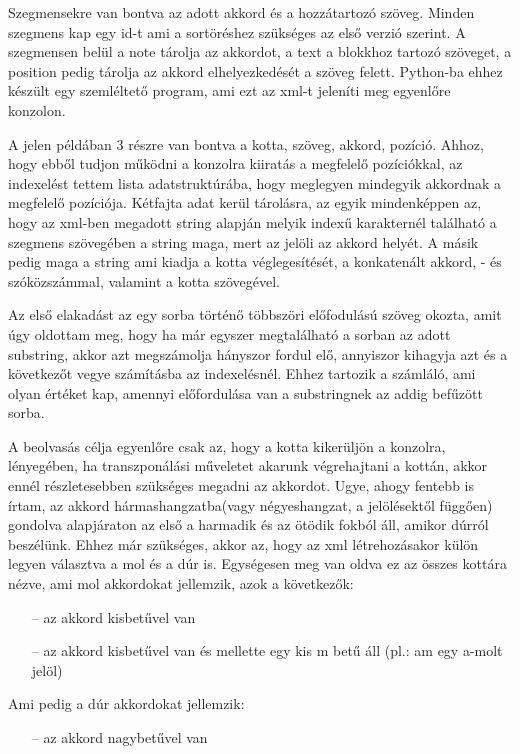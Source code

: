 Szegmensekre van bontva az adott akkord és a hozzátartozó szöveg. Minden szegmens kap egy id-t ami a sortöréshez szükséges az első verzió szerint. A szegmensen belül a note tárolja az akkordot, a text a blokkhoz tartozó szöveget, a position pedig tárolja az akkord elhelyezkedését a szöveg felett. Python-ba ehhez készült egy szemléltető program, ami ezt az xml-t jeleníti meg egyenlőre konzolon.

A jelen példában 3 részre van bontva a kotta, szöveg, akkord, pozíció. Ahhoz, hogy ebből tudjon  működni a konzolra kiiratás a megfelelő pozíciókkal, az indexelést tettem lista adatstruktúrába, hogy meglegyen mindegyik akkordnak a megfelelő pozíciója. Kétfajta adat kerül tárolásra, az egyik mindenképpen az, hogy az xml-ben megadott string alapján melyik indexű karakternél található a szegmens szövegében a string maga, mert az jelöli az akkord helyét. A másik pedig maga a string ami kiadja a kotta véglegesítését, a konkatenált akkord, - és szóközszámmal, valamint a kotta szövegével.

Az első elakadást az egy sorba történő többszöri előfodulású szöveg okozta, amit úgy oldottam meg, hogy ha már egyszer megtalálható a sorban az adott substring, akkor azt megszámolja hányszor fordul elő, annyiszor kihagyja azt és a következőt vegye számításba az indexelésnél. Ehhez tartozik a számláló, ami olyan értéket kap, amennyi előfordulása van a substringnek az addig befűzött sorba.

A beolvasás célja egyenlőre csak az, hogy a kotta kikerüljön a konzolra, lényegében, ha transzponálási műveletet akarunk végrehajtani a kottán, akkor ennél részletesebben szükséges megadni az akkordot. Ugye, ahogy fentebb is írtam, az akkord hármashangzatba(vagy négyeshangzat, a jelölésektől függően) gondolva alapjáraton az első a harmadik és az ötödik fokból áll, amikor dúrról beszélünk. Ehhez már szükséges, akkor az, hogy az xml létrehozásakor külön legyen választva a mol és a dúr is. Egységesen meg van oldva ez az összes kottára nézve, ami mol akkordokat jellemzik, azok a következők:
\begin{itemize}
\item[--]az akkord kisbetűvel van
\item[--]az akkord kisbetűvel van és mellette egy kis m betű áll (pl.: am egy a-molt jelöl)\linebreak
\end{itemize}
Ami pedig a dúr akkordokat jellemzik:
\begin{itemize}
	\item[--]az akkord nagybetűvel van
\end{itemize}
	
